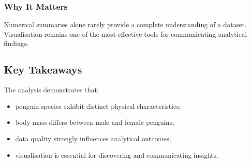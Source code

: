 \documentclass[
]{article}
\providecommand{\tightlist}{%
  \setlength{\itemsep}{0pt}\setlength{\parskip}{0pt}}
\begin{document}
\subsubsection{Why It Matters}\label{why-it-matters-1}

Numerical summaries alone rarely provide a complete understanding of a
dataset. Visualisation remains one of the most effective tools for
communicating analytical findings.

\subsection{Key Takeaways}\label{key-takeaways}

The analysis demonstrates that:

\begin{itemize}
\tightlist
\item
  penguin species exhibit distinct physical characteristics;
\item
  body mass differs between male and female penguins;
\item
  data quality strongly influences analytical outcomes;
\item
  visualisation is essential for discovering and communicating insights.
\end{itemize}
\end{document}
